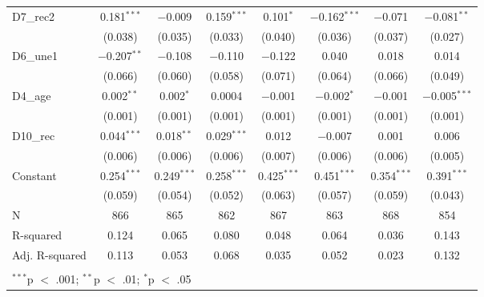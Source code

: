 \documentclass[
]{article}
\begin{document}
\begin{table}[!htbp]
\begin{tabular}{@{\extracolsep{5pt}}lccccccc}
  D7\_rec2 & 0.181$^{***}$ & $-$0.009 & 0.159$^{***}$ & 0.101$^{*}$ & $-$0.162$^{***}$ & $-$0.071 & $-$0.081$^{**}$ \\ 
  & (0.038) & (0.035) & (0.033) & (0.040) & (0.036) & (0.037) & (0.027) \\ 
  D6\_une1 & $-$0.207$^{**}$ & $-$0.108 & $-$0.110 & $-$0.122 & 0.040 & 0.018 & 0.014 \\ 
  & (0.066) & (0.060) & (0.058) & (0.071) & (0.064) & (0.066) & (0.049) \\ 
  D4\_age & 0.002$^{**}$ & 0.002$^{*}$ & 0.0004 & $-$0.001 & $-$0.002$^{*}$ & $-$0.001 & $-$0.005$^{***}$ \\ 
  & (0.001) & (0.001) & (0.001) & (0.001) & (0.001) & (0.001) & (0.001) \\ 
  D10\_rec & 0.044$^{***}$ & 0.018$^{**}$ & 0.029$^{***}$ & 0.012 & $-$0.007 & 0.001 & 0.006 \\ 
  & (0.006) & (0.006) & (0.006) & (0.007) & (0.006) & (0.006) & (0.005) \\ 
  Constant & 0.254$^{***}$ & 0.249$^{***}$ & 0.258$^{***}$ & 0.425$^{***}$ & 0.451$^{***}$ & 0.354$^{***}$ & 0.391$^{***}$ \\ 
  & (0.059) & (0.054) & (0.052) & (0.063) & (0.057) & (0.059) & (0.043) \\ 
 N & 866 & 865 & 862 & 867 & 863 & 868 & 854 \\ 
R-squared & 0.124 & 0.065 & 0.080 & 0.048 & 0.064 & 0.036 & 0.143 \\ 
Adj. R-squared & 0.113 & 0.053 & 0.068 & 0.035 & 0.052 & 0.023 & 0.132 \\ 
\hline \\[-1.8ex] 
\multicolumn{8}{l}{$^{***}$p $<$ .001; $^{**}$p $<$ .01; $^{*}$p $<$ .05} \\ 
\end{tabular} 
\end{table}
\end{document}
